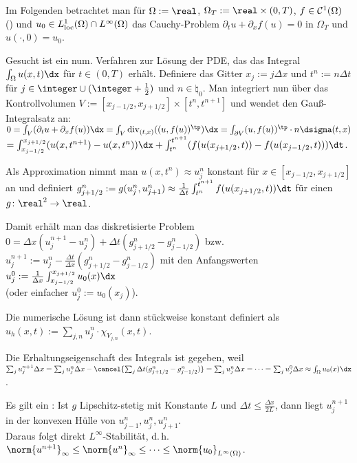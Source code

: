\begin{Bem}
    Im Folgenden betrachtet man für $\Omega := \real$, $\Omega_T := \real \times (0, T)$,
    $f \in \mathcal{C}^1(\Omega)$ ()
    und $u_0 \in L^1_{\text{loc}}(\Omega) \cap L^\infty(\Omega)$
    das Cauchy-Problem $\partial_t u + \partial_x f(u) = 0$ in $\Omega_T$ und
    $u(\cdot, 0) = u_0$.
    
    Gesucht ist ein num. Verfahren zur Lösung der PDE, das das Integral
    $\int_\Omega u(x, t) \dx$ für $t \in (0, T)$ erhält.
    Definiere das Gitter $x_j := j \Delta x$ und $t^n := n \Delta t$ für
    $j \in \integer \cup (\integer + \frac{1}{2})$ und $n \in \natural_0$.
    Man integriert nun über das Kontrollvolumen $V := [x_{j-1/2}, x_{j+1/2}] \times [t^n, t^{n+1}]$
    und wendet den Gauß-Integralsatz an:
    $0 = \int_V (\partial_t u + \partial_x f(u)) \dx
    = \int_V \div_{(t,x)}((u, f(u))^\tp) \dx
    = \int_{\partial V} (u, f(u))^\tp \cdot n \dsigma(t, x)$\\
    $= \int_{x_{j-1/2}}^{x_{j+1/2}} (u(x, t^{n+1}) - u(x, t^n)) \dx +
    \int_{t^n}^{t^{n+1}} (f(u(x_{j+1/2}, t)) - f(u(x_{j-1/2}, t))) \dt$.
    
    Als Approximation nimmt man $u(x, t^n) \approx u_j^n$ konstant für
    $x \in [x_{j-1/2}, x_{j+1/2}]$ an und definiert
    $g_{j+1/2}^n := g(u_j^n, u_{j+1}^n) \approx
    \frac{1}{\Delta t} \int_{t^n}^{t^{n+1}} f(u(x_{j+1/2}, t)) \dt$
    für einen  $g\colon \real^2 \to \real$.
    
    Damit erhält man das diskretisierte Problem
    $0 = \Delta x (u_j^{n+1} - u_j^n) + \Delta t (g_{j+1/2}^n - g_{j-1/2}^n)$ bzw.\\
    $u_j^{n+1} := u_j^n - \frac{\Delta t}{\Delta x} (g_{j+1/2}^n - g_{j-1/2}^n)$
    mit den Anfangswerten $u_j^0 := \frac{1}{\Delta x} \int_{x_{j-1/2}}^{x_{j+1/2}} u_0(x) \dx$\\
    (oder einfacher $u_j^0 := u_0(x_j)$).
    
    Die numerische Lösung ist dann stückweise konstant definiert als
    $u_h(x, t) := \sum_{j,n} u_j^n \cdot \chi_{V_{j,n}}(x, t)$.
\end{Bem}

\linie

\begin{Bem}
    Die Erhaltungseigenschaft des Integrals ist gegeben, weil\\
    $\sum_j u_j^{n+1} \Delta x
    = \sum_j u_j^n \Delta x - \cancel{\sum_j \Delta t (g_{j+1/2}^n - g_{j-1/2}^n)}
    = \sum_j u_j^n \Delta x
    = \dotsb
    = \sum_j u_j^0 \Delta x
    \approx \int_\Omega u_0(x) \dx$.
    
    Es gilt ein :
    Ist $g$ Lipschitz-stetig mit Konstante $L$ und $\Delta t \le \frac{\Delta x}{2L}$,
    dann liegt $u_j^{n+1}$ in der konvexen Hülle von $u_{j-1}^n, u_j^n, u_{j+1}^n$.\\
    Daraus folgt direkt $L^\infty$-Stabilität,
    d.\,h. $\norm{u^{n+1}}_\infty \le \norm{u^n}_\infty \le \dotsb \le
    \norm{u_0}_{L^\infty(\Omega)}$.
\end{Bem}

